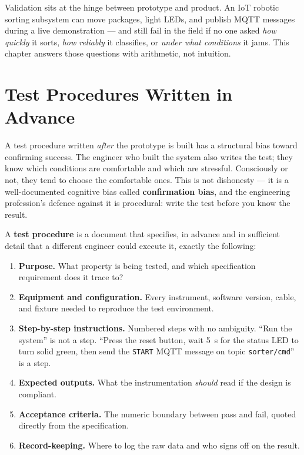 Validation sits at the hinge between prototype and product.
An IoT robotic sorting subsystem can move packages, light LEDs, and publish MQTT messages
during a live demonstration --- and still fail in the field if no one asked \emph{how
quickly} it sorts, \emph{how reliably} it classifies, or \emph{under what conditions} it
jams.
This chapter answers those questions with arithmetic, not intuition.

\section{Test Procedures Written in Advance}
\label{sec:ch14-procedures}

A test procedure written \emph{after} the
prototype is built has a structural bias toward confirming success.
The engineer who built the system also writes the test; they know which conditions are
comfortable and which are stressful.
Consciously or not, they tend to choose the comfortable ones.
This is not dishonesty --- it is a well-documented cognitive bias called
\textbf{confirmation bias}, and the engineering profession's
defence against it is procedural: write the test before you know the result.

A \textbf{test procedure} is a document that specifies, in advance
and in sufficient detail that a different engineer could execute it, exactly the following:

\begin{enumerate}
  \item \textbf{Purpose.} What property is being tested, and which specification requirement
        does it trace to?
  \item \textbf{Equipment and configuration.} Every instrument, software version, cable,
        and fixture needed to reproduce the test environment.
  \item \textbf{Step-by-step instructions.} Numbered steps with no ambiguity.
        ``Run the system'' is not a step.
        ``Press the reset button, wait 5~s for the status LED to turn solid green, then
        send the \texttt{START} MQTT message on topic \texttt{sorter/cmd}'' is a step.
  \item \textbf{Expected outputs.} What the instrumentation \emph{should} read if the
        design is compliant.
  \item \textbf{Acceptance criteria.} The numeric boundary between pass and fail, quoted
        directly from the specification.
  \item \textbf{Record-keeping.} Where to log the raw data and who signs off on the result.
\end{enumerate}

